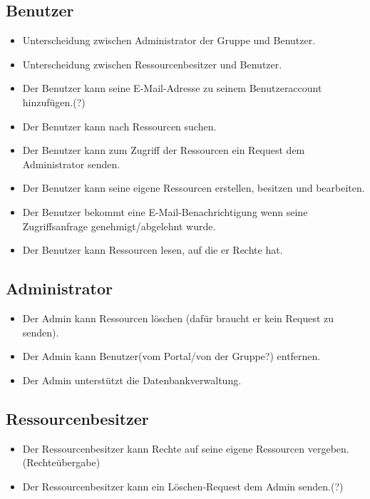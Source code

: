\documentclass[parskip=full,11pt]{scrartcl}
\begin{document}
\subsection*{Benutzer}
\begin{itemize}[itemsep=0pt]
\item Unterscheidung zwischen \gls{Administrator} der Gruppe und Benutzer.
\item Unterscheidung zwischen \gls{Ressourcenbesitzer} und Benutzer.
 
\item Der Benutzer kann seine E-Mail-Adresse zu seinem Benutzeraccount hinzufügen.(?)
\item Der Benutzer kann nach Ressourcen suchen.
\item Der Benutzer kann zum Zugriff der Ressourcen ein Request dem Administrator senden.
\item Der Benutzer kann seine eigene Ressourcen erstellen, besitzen und bearbeiten.
\item Der Benutzer bekommt eine E-Mail-Benachrichtigung wenn seine Zugriffsanfrage genehmigt/abgelehnt wurde.
\item Der Benutzer kann Ressourcen lesen, auf die er Rechte hat.
\end{itemize}
\subsection*{Administrator}
\begin{itemize}[itemsep=0pt]
\item Der Admin kann Ressourcen löschen (dafür braucht er kein Request zu senden).
\item Der Admin kann Benutzer(vom Portal/von der Gruppe?) entfernen.
\item Der Admin unterstützt die Datenbankverwaltung.
\end{itemize}
 
\subsection*{Ressourcenbesitzer}
\begin{itemize}[itemsep=0pt]
\item Der Ressourcenbesitzer kann Rechte auf seine eigene Ressourcen vergeben.(Rechteübergabe)
\item Der Ressourcenbesitzer kann ein \gls{Löschen-Request} dem Admin senden.(?)
\end{itemize}

\end{document}

